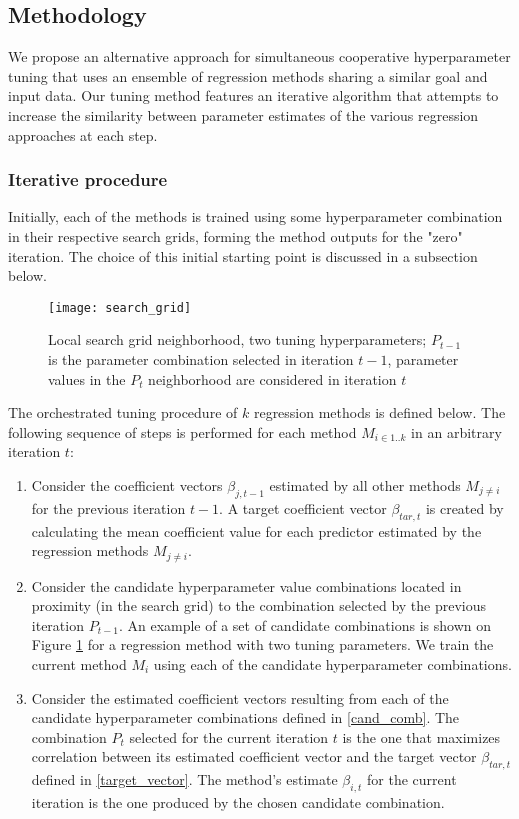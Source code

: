 \subsection{Methodology} \label{sec:orc_meth}
We propose an alternative approach for simultaneous cooperative hyperparameter tuning that uses an ensemble of regression methods sharing a similar goal and input data. Our tuning method features an iterative algorithm that attempts to increase the similarity between parameter estimates of the various regression approaches at each step.

\subsubsection{Iterative procedure}
Initially, each of the methods is trained using some hyperparameter combination in their respective search grids, forming the method outputs for the "zero" iteration. The choice of this initial starting point is discussed in a subsection below.

\begin{figure}[H]
	\centering
	\texttt{[image: search\_grid]}
	\caption{Local search grid neighborhood, two tuning hyperparameters; $P_{t-1}$ is the parameter combination selected in iteration $t-1$, parameter values in the $P_t$ neighborhood are considered in iteration $t$}
	\label{fig:orc_tun_search_grid}
\end{figure}

The orchestrated tuning procedure of $k$ regression methods is defined below. The following sequence of steps is performed for each method $M_{i \in 1..k}$ in an arbitrary iteration $t$:
\begin{enumerate}
	\item \label{target_vector} Consider the coefficient vectors $\beta_{j, t-1}$ estimated by all other methods $M_{j \ne i}$ for the previous iteration $t-1$. A target coefficient vector $\beta_{tar, t}$ is created by calculating the mean coefficient value for each predictor estimated by the regression methods $M_{j \ne i}$.
	\item \label{cand_comb} Consider the candidate hyperparameter value combinations located in proximity (in the search grid) to the combination selected by the previous iteration $P_{t-1}$. An example of a set of candidate combinations is shown on Figure \ref{fig:orc_tun_search_grid} for a regression method with two tuning parameters. We train the current method $M_i$ using each of the candidate hyperparameter combinations.
	\item Consider the estimated coefficient vectors resulting from each of the candidate hyperparameter combinations defined in \ref{cand_comb}. The combination $P_t$ selected for the current iteration $t$ is the one that maximizes correlation between its estimated coefficient vector and the target vector $\beta_{tar, t}$ defined in \ref{target_vector}. The method's estimate $\beta_{i, t}$ for the current iteration is the one produced by the chosen candidate combination.
\end{enumerate}

